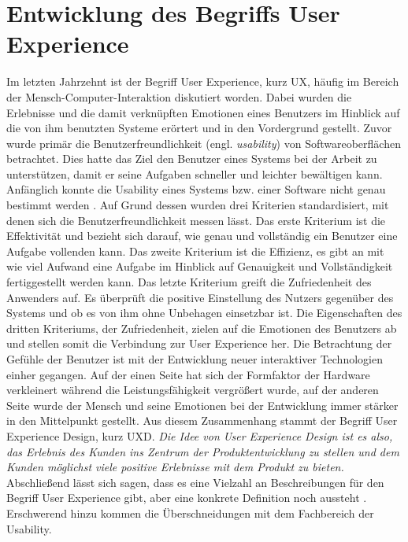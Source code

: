 \section{Entwicklung des Begriffs User Experience}
\label{Anschnitt:EntwicklingUX}
Im letzten Jahrzehnt ist der Begriff User Experience, kurz UX, häufig im Bereich der Mensch-Computer-Interaktion diskutiert worden. Dabei wurden die Erlebnisse und die damit verknüpften Emotionen eines Benutzers im Hinblick auf die von ihm benutzten Systeme erörtert und in den Vordergrund gestellt. Zuvor wurde primär die Benutzerfreundlichkeit (engl. \textit{usability}) von Softwareoberflächen betrachtet. Dies hatte das Ziel den Benutzer eines Systems bei der Arbeit zu unterstützen, damit er seine Aufgaben schneller und leichter bewältigen kann. \cite[S. 23f.]{Nielsen:1994vk}  \\
Anfänglich konnte die Usability eines Systems bzw. einer Software nicht genau bestimmt werden \cite[S. 23f.]{Nielsen:1994vk}. Auf Grund dessen wurden drei Kriterien standardisiert, mit denen sich die Benutzerfreundlichkeit messen lässt. Das erste Kriterium ist die Effektivität und bezieht sich darauf, wie genau und vollständig ein Benutzer eine Aufgabe vollenden kann. Das zweite Kriterium ist die Effizienz, es gibt an mit wie viel Aufwand eine Aufgabe im Hinblick auf Genauigkeit und Vollständigkeit fertiggestellt werden kann. Das letzte Kriterium greift die Zufriedenheit des Anwenders auf. Es überprüft die positive Einstellung des Nutzers gegenüber des Systems und ob es von ihm ohne Unbehagen einsetzbar ist.
\cite{DIS:3VJ9kaCr}
Die Eigenschaften des dritten Kriteriums, der Zufriedenheit, zielen auf die Emotionen des Benutzers ab und stellen somit die Verbindung zur User Experience her.
Die Betrachtung der Gefühle der Benutzer ist mit der Entwicklung neuer interaktiver Technologien einher gegangen. Auf der einen Seite hat sich der Formfaktor der Hardware verkleinert während die Leistungsfähigkeit vergrößert wurde, auf der anderen Seite wurde der Mensch und seine Emotionen bei der Entwicklung immer stärker in den Mittelpunkt gestellt. Aus diesem Zusammenhang stammt der Begriff User Experience Design, kurz UXD. \glqq \textit{Die Idee von User Experience Design ist es also, das Erlebnis des Kunden ins Zentrum der Produktentwicklung zu stellen und dem Kunden möglichst viele positive Erlebnisse mit dem Produkt zu bieten.}\grqq\ \cite[S. 3]{Moser:2012cn} \\
Abschließend lässt sich sagen, dass es eine Vielzahl an Beschreibungen für den Begriff User Experience gibt, aber eine konkrete Definition noch aussteht \cite[S. 4]{Bernhaupt:2010vi}. Erschwerend hinzu kommen die Überschneidungen mit dem Fachbereich der Usability.







